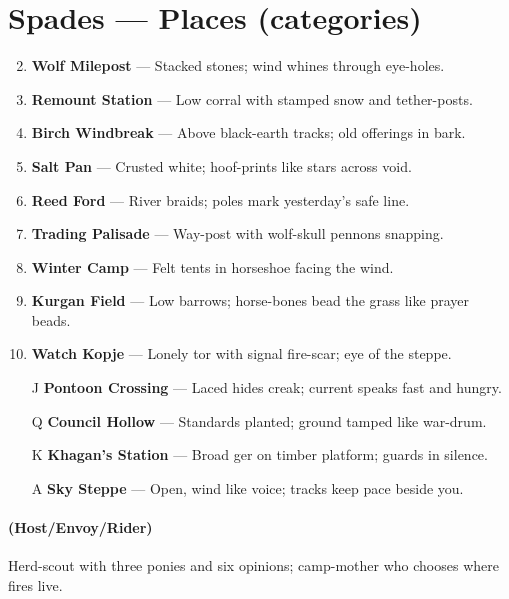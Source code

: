 \section*{Spades --- Places (categories)}
\label{sec:ykrul-places}
\begin{enumerate}
\setcounter{enumi}{1}
\item \textbf{Wolf Milepost} --- Stacked stones; wind whines through eye-holes.
\item \textbf{Remount Station} --- Low corral with stamped snow and tether-posts.
\item \textbf{Birch Windbreak} --- Above black-earth tracks; old offerings in bark.
\item \textbf{Salt Pan} --- Crusted white; hoof-prints like stars across void.
\item \textbf{Reed Ford} --- River braids; poles mark yesterday's safe line.
\item \textbf{Trading Palisade} --- Way-post with wolf-skull pennons snapping.
\item \textbf{Winter Camp} --- Felt tents in horseshoe facing the wind.
\item \textbf{Kurgan Field} --- Low barrows; horse-bones bead the grass like prayer beads.
\item \textbf{Watch Kopje} --- Lonely tor with signal fire-scar; eye of the steppe.
\item[J] \textbf{Pontoon Crossing} --- Laced hides creak; current speaks fast and hungry.
\item[Q] \textbf{Council Hollow} --- Standards planted; ground tamped like war-drum.
\item[K] \textbf{Khagan's Station} --- Broad ger on timber platform; guards in silence.
\item[A] \textbf{Sky Steppe} --- Open, wind like voice; tracks keep pace beside you.
\end{enumerate}

\paragraph*{(Host/Envoy/Rider)} Herd-scout with three ponies and six opinions; camp-mother who chooses where fires live.

